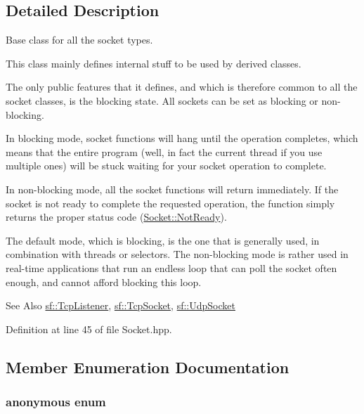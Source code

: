 \subsection{Detailed Description}
Base class for all the socket types. 

This class mainly defines internal stuff to be used by derived classes.

The only public features that it defines, and which is therefore common to all the socket classes, is the blocking state. All sockets can be set as blocking or non-\/blocking.

In blocking mode, socket functions will hang until the operation completes, which means that the entire program (well, in fact the current thread if you use multiple ones) will be stuck waiting for your socket operation to complete.

In non-\/blocking mode, all the socket functions will return immediately. If the socket is not ready to complete the requested operation, the function simply returns the proper status code (\hyperlink{classsf_1_1Socket_a51bf0fd51057b98a10fbb866246176dca8554848daae98f996e131bdeed076c09}{Socket\-::\-Not\-Ready}).

The default mode, which is blocking, is the one that is generally used, in combination with threads or selectors. The non-\/blocking mode is rather used in real-\/time applications that run an endless loop that can poll the socket often enough, and cannot afford blocking this loop.

\begin{DoxySeeAlso}{See Also}
\hyperlink{classsf_1_1TcpListener}{sf\-::\-Tcp\-Listener}, \hyperlink{classsf_1_1TcpSocket}{sf\-::\-Tcp\-Socket}, \hyperlink{classsf_1_1UdpSocket}{sf\-::\-Udp\-Socket} 
\end{DoxySeeAlso}


Definition at line 45 of file Socket.\-hpp.



\subsection{Member Enumeration Documentation}
\hypertarget{classsf_1_1Socket_a5deb2c955fd347259c3a20d27b2481aa}{\subsubsection[{anonymous enum}]{\setlength{\rightskip}{0pt plus 5cm}anonymous enum}}\label{classsf_1_1Socket_a5deb2c955fd347259c3a20d27b2481aa}



